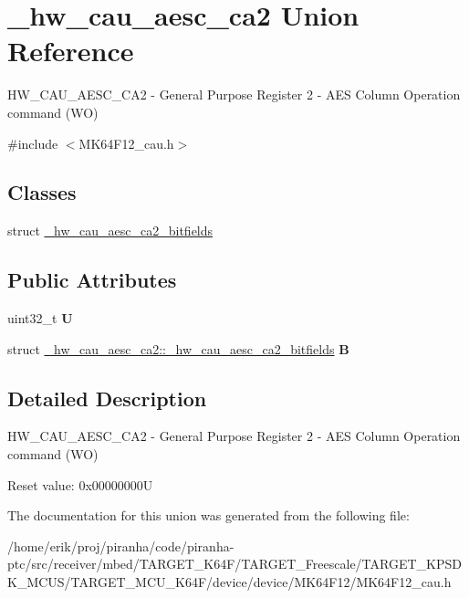 \hypertarget{union__hw__cau__aesc__ca2}{}\section{\+\_\+hw\+\_\+cau\+\_\+aesc\+\_\+ca2 Union Reference}
\label{union__hw__cau__aesc__ca2}


H\+W\+\_\+\+C\+A\+U\+\_\+\+A\+E\+S\+C\+\_\+\+C\+A2 -\/ General Purpose Register 2 -\/ A\+ES Column Operation command (WO)  




{\ttfamily \#include $<$M\+K64\+F12\+\_\+cau.\+h$>$}

\subsection*{Classes}
\begin{DoxyCompactItemize}
\item 
struct \hyperlink{struct__hw__cau__aesc__ca2_1_1__hw__cau__aesc__ca2__bitfields}{\+\_\+hw\+\_\+cau\+\_\+aesc\+\_\+ca2\+\_\+bitfields}
\end{DoxyCompactItemize}
\subsection*{Public Attributes}
\begin{DoxyCompactItemize}
\item 
uint32\+\_\+t {\bfseries U}\hypertarget{union__hw__cau__aesc__ca2_a7b66df8cc859cf461b59319f5d700179}{}\label{union__hw__cau__aesc__ca2_a7b66df8cc859cf461b59319f5d700179}

\item 
struct \hyperlink{struct__hw__cau__aesc__ca2_1_1__hw__cau__aesc__ca2__bitfields}{\+\_\+hw\+\_\+cau\+\_\+aesc\+\_\+ca2\+::\+\_\+hw\+\_\+cau\+\_\+aesc\+\_\+ca2\+\_\+bitfields} {\bfseries B}\hypertarget{union__hw__cau__aesc__ca2_abeaa2790724cb79b121df871c306cbb7}{}\label{union__hw__cau__aesc__ca2_abeaa2790724cb79b121df871c306cbb7}

\end{DoxyCompactItemize}


\subsection{Detailed Description}
H\+W\+\_\+\+C\+A\+U\+\_\+\+A\+E\+S\+C\+\_\+\+C\+A2 -\/ General Purpose Register 2 -\/ A\+ES Column Operation command (WO) 

Reset value\+: 0x00000000U 

The documentation for this union was generated from the following file\+:\begin{DoxyCompactItemize}
\item 
/home/erik/proj/piranha/code/piranha-\/ptc/src/receiver/mbed/\+T\+A\+R\+G\+E\+T\+\_\+\+K64\+F/\+T\+A\+R\+G\+E\+T\+\_\+\+Freescale/\+T\+A\+R\+G\+E\+T\+\_\+\+K\+P\+S\+D\+K\+\_\+\+M\+C\+U\+S/\+T\+A\+R\+G\+E\+T\+\_\+\+M\+C\+U\+\_\+\+K64\+F/device/device/\+M\+K64\+F12/M\+K64\+F12\+\_\+cau.\+h\end{DoxyCompactItemize}
